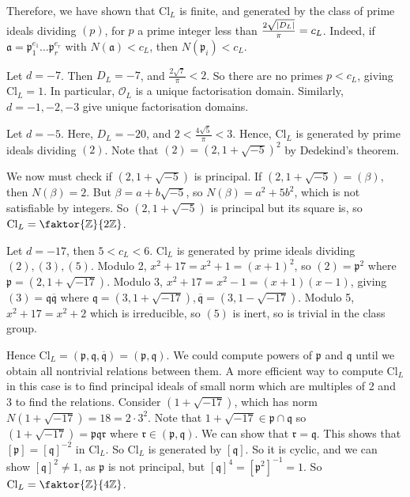 Therefore, we have shown that \( \mathrm{Cl}_L \) is finite, and generated by the class of prime ideals dividing \( (p) \), for \( p \) a prime integer less than \( \frac{2\sqrt{\abs{D_L}}}{\pi} = c_L \).
Indeed, if \( \mathfrak a = \mathfrak p_1^{e_1} \dots \mathfrak p_r^{e_r} \) with \( N(\mathfrak a) < c_L \), then \( N(\mathfrak p_i) < c_L \).
\begin{example}
    Let \( d = -7 \).
    Then \( D_L = -7 \), and \( \frac{2\sqrt{7}}{\pi} < 2 \).
    So there are no primes \( p < c_L \), giving \( \mathrm{Cl}_L = \qty{1} \).
    In particular, \( \mathcal O_L \) is a unique factorisation domain.
    Similarly, \( d = -1, -2, -3 \) give unique factorisation domains.
\end{example}
\begin{example}
    Let \( d = -5 \).
    Here, \( D_L = -20 \), and \( 2 < \frac{4\sqrt{5}}{\pi} < 3 \).
    Hence, \( \mathrm{Cl}_L \) is generated by prime ideals dividing \( (2) \).
    Note that \( (2) = (2, 1 + \sqrt{-5})^2 \) by Dedekind's theorem.

    We now must check if \( (2, 1 + \sqrt{-5}) \) is principal.
    If \( (2, 1 + \sqrt{-5}) = (\beta) \), then \( N(\beta) = 2 \).
    But \( \beta = a + b\sqrt{-5} \), so \( N(\beta) = a^2 + 5 b^2 \), which is not satisfiable by integers.
    So \( (2, 1 + \sqrt{-5}) \) is principal but its square is, so \( \mathrm{Cl}_L = \faktor{\mathbb Z}{2\mathbb Z} \).
\end{example}
\begin{example}
    Let \( d = -17 \), then \( 5 < c_L < 6 \).
    \( \mathrm{Cl}_L \) is generated by prime ideals dividing \( (2), (3), (5) \).
    Modulo 2, \( x^2 + 17 = x^2 + 1 = (x + 1)^2 \), so \( (2) = \mathfrak p^2 \) where \( \mathfrak p = (2, 1 + \sqrt{-17}) \).
    Modulo 3, \( x^2 + 17 = x^2 - 1 = (x + 1)(x - 1) \), giving \( (3) = \mathfrak q \overline{\mathfrak q} \) where \( \mathfrak q = (3, 1 + \sqrt{-17}), \overline{\mathfrak q} = (3, 1 - \sqrt{-17}) \).
    Modulo 5, \( x^2 + 17 = x^2 + 2 \) which is irreducible, so \( (5) \) is inert, so is trivial in the class group.

    Hence \( \mathrm{Cl}_L = (\mathfrak p, \mathfrak q, \overline{\mathfrak q}) = (\mathfrak p, \mathfrak q) \).
    We could compute powers of \( \mathfrak p \) and \( \mathfrak q \) until we obtain all nontrivial relations between them.
    A more efficient way to compute \( \mathrm{Cl}_L \) in this case is to find principal ideals of small norm which are multiples of 2 and 3 to find the relations.
    Consider \( (1 + \sqrt{-17}) \), which has norm \( N(1 + \sqrt{-17}) = 18 = 2 \cdot 3^2 \).
    Note that \( 1 + \sqrt{-17} \in \mathfrak p \cap \mathfrak q \) so \( (1 + \sqrt{-17}) = \mathfrak p \mathfrak q \mathfrak r \) where \( \mathfrak r \in (\mathfrak p, \mathfrak q) \).
    We can show that \( \mathfrak r = \mathfrak q \).
    This shows that \( [\mathfrak p] = [\mathfrak q]^{-2} \) in \( \mathrm{Cl}_L \).
    So \( \mathrm{Cl}_L \) is generated by \( [\mathfrak q] \).
    So it is cyclic, and we can show \( [\mathfrak q]^2 \neq 1 \), as \( \mathfrak p \) is not principal, but \( [\mathfrak q]^4 = [\mathfrak p^2]^{-1} = 1 \).
    So \( \mathrm{Cl}_L = \faktor{\mathbb Z}{4\mathbb Z} \).
\end{example}
